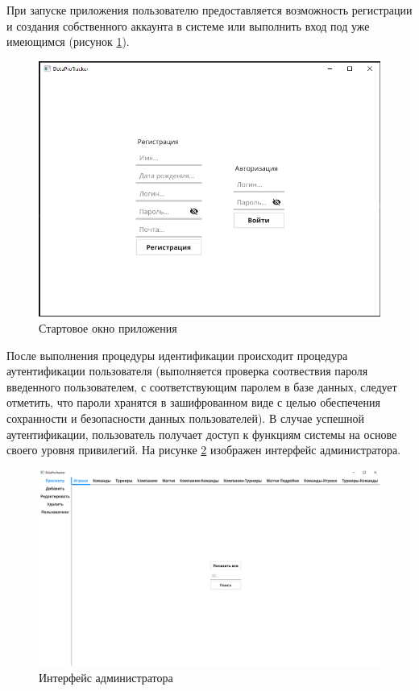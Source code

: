 При запуске приложения пользователю предоставляется возможность регистрации и создания собственного аккаунта в системе или выполнить вход под уже имеющимся (рисунок \ref{fig:login}).

\begin{figure}[h!btp]
	\centering
	\includegraphics[scale = 0.7]{inc/img/login.png}
	\caption{Стартовое окно приложения}
	\label{fig:login}	
\end{figure}

После выполнения процедуры идентификации происходит процедура аутентификации пользователя (выполняется проверка соотвествия пароля введенного пользователем, с соответствующим паролем в базе данных, следует отметить, что пароли хранятся в зашифрованном виде с целью обеспечения сохранности и безопасности данных пользователей). В случае успешной аутентификации, пользователь получает доступ к функциям системы на основе своего уровня привилегий. На рисунке \ref{fig:admin} изображен интерфейс администратора.

\clearpage

\begin{figure}[h!btp]
	\centering
	\includegraphics[scale = 0.4]{inc/img/admin.png}
	\caption{Интерфейс администратора}
	\label{fig:admin}	
\end{figure}

